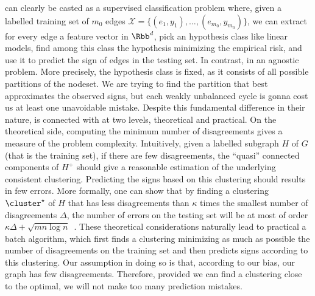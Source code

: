 \esp{} can clearly be casted as a supervised classification problem where, given a labelled training
set of $m_0$ edges $\mathcal{X}=\{(e_1, y_1), \ldots, (e_{m_0}, y_{m_0})\}$, we can extract for
every edge a feature vector in $\Rbb^d$, pick an hypothesis class like linear models, find among
this class the hypothesis minimizing the empirical risk, and use it to predict the sign of edges in
the testing set. In contrast, \pcc{} in an agnostic problem. More precisely, the hypothesis class is
fixed, as it consists of all possible partitions of the nodeset. We are trying to find the partition
that best approximates the observed signs, but each weakly unbalanced cycle is gonna cost us at
least one unavoidable mistake. Despite this fundamental difference in their nature, \pcc{} is
connected with \esp{} at two levels, theoretical and practical. On the theoretical side, computing
the minimum number of disagreements gives a measure of the \esp{} problem complexity.  Intuitively,
given a labelled subgraph $H$ of $G$ (that is the training set), if there are few disagreements, the
\enquote{quasi} connected components of $H^+$ should give a reasonable estimation of the underlying
consistent clustering. Predicting the signs based on this clustering should results in few errors.
More formally, one can show that by finding a clustering $\cluster^\star$ of $H$ that has less
disagreements than $\kappa$ times the smallest number of disagreements $\Delta$, the number of
errors on the testing set will be at most of order $\kappa\Delta + \sqrt{mn\log
n}$~\autocite[Theorem 6]{Cesa-Bianchi2012b}. These theoretical considerations naturally lead to
practical a batch algorithm, which first finds a clustering minimizing as much as possible the number
of disagreements on the training set and then predicts signs according to this clustering. Our
assumption in doing so is that, according to our bias, our graph has few disagreements. Therefore,
provided we can find a clustering close to the optimal, we will not make too many prediction
mistakes.

\bigskip

